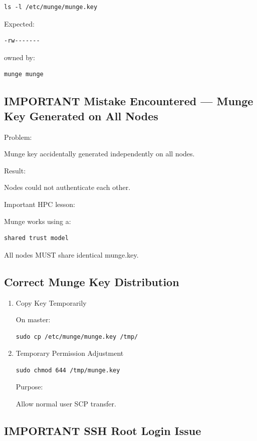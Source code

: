 \documentclass[11pt]{article}
\begin{document}
\begin{verbatim}
ls -l /etc/munge/munge.key
\end{verbatim}

Expected:

\begin{verbatim}
-rw-------
\end{verbatim}

owned by:

\begin{verbatim}
munge munge
\end{verbatim}
\subsection{IMPORTANT Mistake Encountered — Munge Key Generated on All Nodes}
\label{sec:orgb1ddcfc}

Problem:

Munge key accidentally generated independently on all nodes.

Result:

Nodes could not authenticate each other.

Important HPC lesson:

Munge works using a:

\begin{verbatim}
shared trust model
\end{verbatim}

All nodes MUST share identical munge.key.
\subsection{Correct Munge Key Distribution}
\label{sec:org98e1596}
\begin{enumerate}
\item Copy Key Temporarily
\label{sec:org24c7890}

On master:

\begin{verbatim}
sudo cp /etc/munge/munge.key /tmp/
\end{verbatim}
\item Temporary Permission Adjustment
\label{sec:org35cd46b}

\begin{verbatim}
sudo chmod 644 /tmp/munge.key
\end{verbatim}

Purpose:

Allow normal user SCP transfer.
\end{enumerate}
\subsection{IMPORTANT SSH Root Login Issue}
\label{sec:org9a8e04a}
\end{document}

